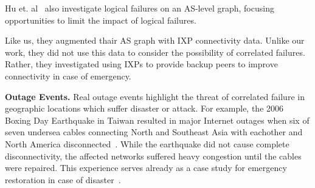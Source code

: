     Hu et. al~\cite{ixp-routingdiversity} also investigate logical failures on
    an AS-level graph, focusing opportunities to limit the impact of logical
    failures.

    Like us, they augmented thair AS graph with IXP connectivity data.  Unlike
    our work, they did not use this data to consider the possibility of
    correlated failures.  Rather, they investigated using IXPs to provide
    backup peers to improve connectivity in case of emergency.

{\bf Outage Events.}  Real outage events highlight the threat of correlated
    failure in geographic locations which suffer disaster or attack.  For
    example, the 2006 Boxing Day Earthquake in Taiwan resulted in major
    Internet outages when six of seven undersea cables connecting North and
    Southeast Asia with eachother and North America
    disconnected~\cite{asia-comm-quake}.  While the earthquake did not cause
    complete disconnectivity, the affected networks suffered heavy congestion
    until the cables were repaired.  This experience serves already as a case
    study for emergency restoration in case of disaster~\cite{taiwan}.
        



